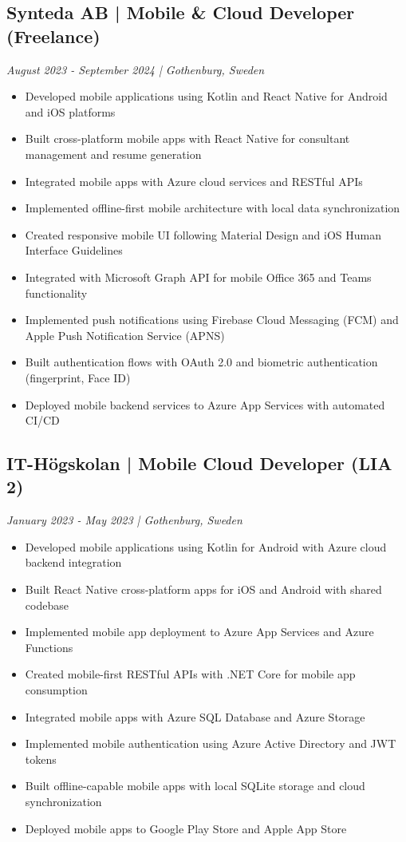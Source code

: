 \documentclass[11pt,a4paper]{article}
\begin{document}
\subsection*{Synteda AB | Mobile \& Cloud Developer (Freelance)}
\textit{August 2023 - September 2024 | Gothenburg, Sweden}

\begin{itemize}[leftmargin=*, itemsep=2pt]
\item Developed mobile applications using Kotlin and React Native for Android and iOS platforms
\item Built cross-platform mobile apps with React Native for consultant management and resume generation
\item Integrated mobile apps with Azure cloud services and RESTful APIs
\item Implemented offline-first mobile architecture with local data synchronization
\item Created responsive mobile UI following Material Design and iOS Human Interface Guidelines
\item Integrated with Microsoft Graph API for mobile Office 365 and Teams functionality
\item Implemented push notifications using Firebase Cloud Messaging (FCM) and Apple Push Notification Service (APNS)
\item Built authentication flows with OAuth 2.0 and biometric authentication (fingerprint, Face ID)
\item Deployed mobile backend services to Azure App Services with automated CI/CD
\end{itemize}

\subsection*{IT-Högskolan | Mobile Cloud Developer (LIA 2)}
\textit{January 2023 - May 2023 | Gothenburg, Sweden}

\begin{itemize}[leftmargin=*, itemsep=2pt]
\item Developed mobile applications using Kotlin for Android with Azure cloud backend integration
\item Built React Native cross-platform apps for iOS and Android with shared codebase
\item Implemented mobile app deployment to Azure App Services and Azure Functions
\item Created mobile-first RESTful APIs with .NET Core for mobile app consumption
\item Integrated mobile apps with Azure SQL Database and Azure Storage
\item Implemented mobile authentication using Azure Active Directory and JWT tokens
\item Built offline-capable mobile apps with local SQLite storage and cloud synchronization
\item Deployed mobile apps to Google Play Store and Apple App Store
\end{itemize}
\end{document}
